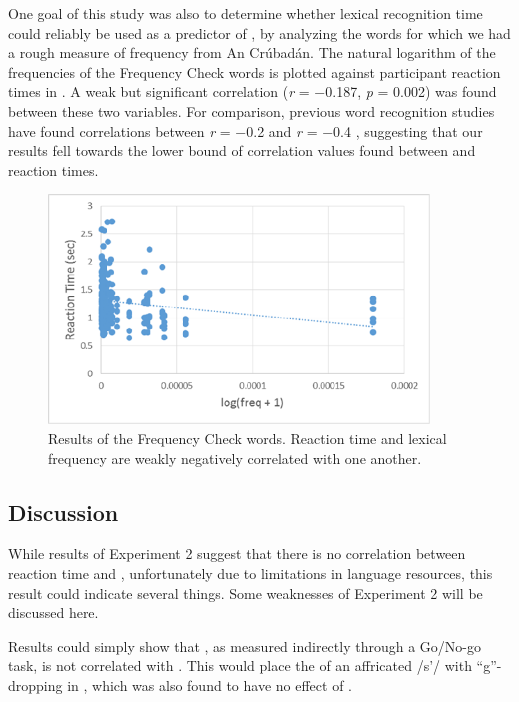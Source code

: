 \documentclass[output=paper
,newtxmath
,modfonts
,nonflat]{langsci/langscibook}
\begin{document}
One goal of this study was also to determine whether lexical recognition time could reliably be used as a predictor of , by analyzing the words for which we had a rough measure of frequency from An Crúbadán. The natural logarithm of the frequencies of the Frequency Check words is plotted against participant reaction times in . A weak but significant correlation (\textit{r} = −0.187, \textit{p} = 0.002) was found between these two variables. For comparison, previous word recognition studies have found correlations between \textit{r} = −0.2 and \textit{r} = −0.4 \citep{brysbaert2011word}, suggesting that our results fell towards the lower bound of correlation values found between  and reaction times.

   

\begin{figure}
\includegraphics[width=0.9\textwidth]{figures/fig-moeng-6.svg}
\caption{Results of the Frequency Check words. Reaction time and lexical frequency are weakly negatively correlated with one another.}
\label{fig:moeng:7}
\end{figure}

\subsection{Discussion}\label{sec:moeng:6.4}

While results of Experiment 2 suggest that there is no correlation between reaction time and , unfortunately due to limitations in language resources, this result could indicate several things. Some weaknesses of Experiment 2 will be discussed here.

Results could simply show that , as measured indirectly through a Go/No-go task, is not correlated with . This would place the  of an affricated /s’/ with “g”-dropping in , which was also found to have no effect of  \citep{labov2011principles}.
\end{document}
